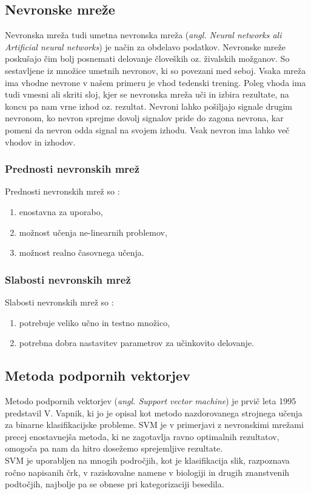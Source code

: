 \documentclass{acm_proc_article-sp}
\begin{document}
\subsection{Nevronske mreže}
Nevronska mreža tudi umetna nevronska mreža (\textit{angl.
Neural networks ali Artificial neural networks}) je način za obdelavo podatkov.
Nevronske mreže poskušajo čim bolj posnemati delovanje človeških oz. živalskih možganov.
So sestavljene iz množice umetnih nevronov, ki so povezani med seboj.
Vsaka mreža ima vhodne nevrone v našem primeru je vhod tedenski trening.
Poleg vhoda ima tudi vmesni ali skriti sloj, kjer se nevronska mreža uči in izbira rezultate, na koncu pa nam vrne izhod oz. rezultat.
Nevroni lahko pošiljajo signale drugim nevronom, ko nevron sprejme dovolj signalov pride do zagona nevrona, kar pomeni da nevron odda signal na svojem izhodu.
Vsak nevron ima lahko več vhodov in izhodov.

\subsubsection{Prednosti nevronskih mrež}
Prednosti nevronskih mrež so \cite{nnetworks}:
\begin{enumerate}
\item{enostavna za uporabo,}
\item{možnost učenja ne-linearnih problemov,}
\item{možnost realno časovnega učenja.}
\end{enumerate}

\subsubsection{Slabosti nevronskih mrež}
Slabosti nevronskih mrež so \cite{nnetworks}:
\begin{enumerate}
\item{potrebuje veliko učno in testno množico,}
\item{potrebna dobra nastavitev parametrov za učinkovito delovanje.}
\end{enumerate}

\subsection{Metoda podpornih vektorjev}
Metodo podpornih  vektorjev (\textit{angl. Support vector machine}) je prvič leta 1995 predstavil V. Vapnik\cite{Vapnik}, ki jo je opisal kot metodo nazdorovanega strojnega učenja za binarne klasifikacijske probleme. SVM je v primerjavi z nevronskimi mrežami precej enostavnejša metoda, ki ne zagotavlja ravno optimalnih rezultatov, omogoča pa nam da hitro dosežemo sprejemljive rezultate\cite{Hsu}.\\
SVM je uporabljen na mnogih področjih, kot je klasifikacija slik, razpoznava ročno napisanih črk, v raziskovalne namene v biologiji in drugih znanstvenih podtočjih, najbolje pa se obnese pri kategorizaciji besedila\cite{Wiki_svm}.\\
\end{document}
